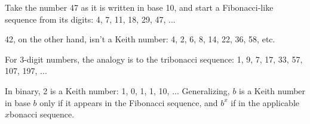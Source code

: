 \documentclass[12pt]{article}
\begin{document}
Take the number 47 as it is written in base 10, and start a Fibonacci-like sequence from its digits: 4, 7, 11, 18, 29, 47, ...

42, on the other hand, isn't a Keith number: 4, 2, 6, 8, 14, 22, 36, 58, etc.

For 3-digit numbers, the analogy is to the tribonacci sequence: 1, 9, 7, 17, 33, 57, 107, 197, ...

In binary, 2 is a Keith number: 1, 0, 1, 1, 10, ... Generalizing, $b$ is a Keith number in base $b$ only if it appears in the Fibonacci sequence, and $b^x$ if in the applicable $x$bonacci sequence.
\end{document}
